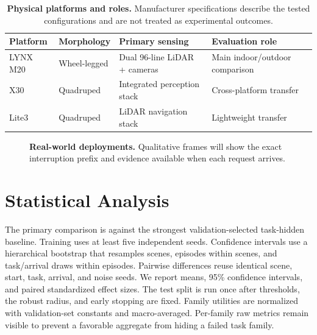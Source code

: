 \begin{table}[h]
  \centering
  \small
  \begin{tabular}{@{}llll@{}}
    \toprule
    \textbf{Platform} & \textbf{Morphology} & \textbf{Primary sensing} & \textbf{Evaluation role} \\
    \midrule
    LYNX M20 & Wheel-legged & Dual 96-line LiDAR + cameras & Main indoor/outdoor comparison \\
    X30 & Quadruped & Integrated perception stack & Cross-platform transfer \\
    Lite3 & Quadruped & LiDAR navigation stack & Lightweight transfer \\
    \bottomrule
  \end{tabular}
  \caption{\textbf{Physical platforms and roles.} Manufacturer specifications describe the tested configurations and are not treated as experimental outcomes.}
  \label{tab:robot-platforms}
\end{table}

\begin{table}[h]
  \centering
  \caption{\textbf{Physical robot evaluation.}
  Populate every cell from completed trials under the matched real-world protocol.}
  \label{tab:realworld}
\end{table}

\begin{figure}[h]
  \centering
  \caption{\textbf{Real-world deployments.}
  Qualitative frames will show the exact interruption prefix and evidence available when each request arrives.}
  \label{fig:realworld}
\end{figure}

\section{Statistical Analysis}
\label{app:statistics}

The primary comparison is \method{} against the strongest validation-selected task-hidden baseline.
Training uses at least five independent seeds.
Confidence intervals use a hierarchical bootstrap that resamples scenes, episodes within scenes, and task/arrival draws within episodes.
Pairwise differences reuse identical scene, start, task, arrival, and noise seeds.
We report means, 95\% confidence intervals, and paired standardized effect sizes.
The test split is run once after thresholds, the robust radius, and early stopping are fixed.
Family utilities are normalized with validation-set constants and macro-averaged.
Per-family raw metrics remain visible to prevent a favorable aggregate from hiding a failed task family.

